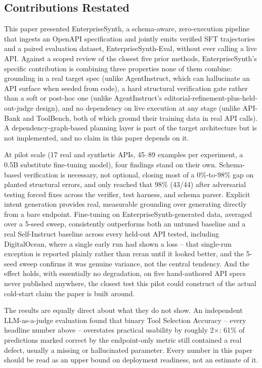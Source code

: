 \documentclass[letterpaper]{article} %
\begin{document}
\subsection{Contributions Restated}
This paper presented EnterpriseSynth, a schema-aware, zero-execution pipeline that ingests an
OpenAPI specification and jointly emits verified SFT trajectories and a paired evaluation dataset,
EnterpriseSynth-Eval, without ever calling a live API. Against a scoped review of the closest five
prior methods, EnterpriseSynth's specific contribution is combining three properties none of them
combine: grounding in a real target spec (unlike AgentInstruct, which can hallucinate an API
surface when seeded from code), a hard structural verification gate rather than a soft or
post-hoc one (unlike AgentInstruct's editorial-refinement-plus-held-out-judge design), and no
dependency on live execution at any stage (unlike API-Bank and ToolBench, both of which ground
their training data in real API calls). A dependency-graph-based planning layer is part of the
target architecture but is not implemented, and no claim in this paper depends on it.

At pilot scale (17 real and synthetic APIs, 45--89 examples per experiment, a 0.5B substitute
fine-tuning model), four findings stand on their own. Schema-based verification is necessary, not
optional, closing most of a 0\%-to-98\% gap on planted structural errors, and only reached that
98\% (43/44) after adversarial testing forced fixes across the verifier, test harness, and schema
parser. Explicit intent generation provides real, measurable grounding over generating directly
from a bare
endpoint. Fine-tuning on EnterpriseSynth-generated data, averaged over a 5-seed sweep, consistently
outperforms both an untuned baseline and a real Self-Instruct baseline across every held-out API
tested, including DigitalOcean, where a single early run had shown a loss -- that single-run
exception is reported plainly rather than reran until it looked better, and the 5-seed sweep
confirms it was genuine variance, not the central tendency. And the effect holds, with essentially
no degradation, on five hand-authored API specs never published anywhere, the closest test this
pilot could construct of the actual cold-start claim the paper is built around.

The results are equally direct about what they do not show. An independent LLM-as-a-judge
evaluation found that binary Tool Selection Accuracy -- every headline number above -- overstates
practical usability by roughly 2$\times$: 61\% of predictions marked correct by the endpoint-only
metric still contained a real defect, usually a missing or hallucinated parameter. Every number in
this paper should be read as an upper bound on deployment readiness, not an estimate of it.
\end{document}
